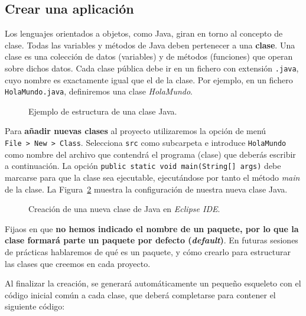 \documentclass[
  spanish,
  11pt,
  a4paper,
  DIV=11,
  numbers=noendperiod]{scrartcl}
\begin{document}
\subsection{Crear una aplicación}\label{crear-una-aplicaciuxf3n}

Los lenguajes orientados a objetos, como Java, giran en torno al concepto de clase. Todas las variables y métodos de Java deben pertenecer a una \textbf{clase}. Una clase es una colección de datos (variables) y de métodos (funciones) que operan sobre dichos datos. Cada clase pública debe ir en un fichero con extensión \texttt{.java}, cuyo nombre es exactamente igual que el de la clase. Por ejemplo, en un fichero \texttt{HolaMundo.java}, definiremos una clase \emph{HolaMundo}.

\begin{figure}
\caption{Ejemplo de estructura de una clase Java.}\label{fig-class_skeleton}
\end{figure}

Para \textbf{añadir nuevas clases} al proyecto utilizaremos la opción de menú \texttt{File\ \textgreater{}\ New\ \textgreater{}\ Class}. Selecciona \texttt{src} como subcarpeta e introduce \texttt{HolaMundo} como nombre del archivo que contendrá el programa (clase) que deberás escribir a continuación. La opción \texttt{public\ static\ void\ main(String{[}{]}\ args)} debe marcarse para que la clase sea ejecutable, ejecutándose por tanto el método \emph{main} de la clase. La Figura~\ref{fig-new_class} muestra la configuración de nuestra nueva clase Java.

\begin{figure}
\caption{Creación de una nueva clase de Java en \emph{Eclipse IDE}.}\label{fig-new_class}
\end{figure}

Fijaos en que \textbf{no hemos indicado el nombre de un paquete, por lo que la clase formará parte un paquete por defecto (\emph{default})}. En futuras sesiones de prácticas hablaremos de qué es un paquete, y cómo crearlo para estructurar las clases que creemos en cada proyecto.

Al finalizar la creación, se generará automáticamente un pequeño esqueleto con el código inicial común a cada clase, que deberá completarse para contener el siguiente código:
\end{document}
